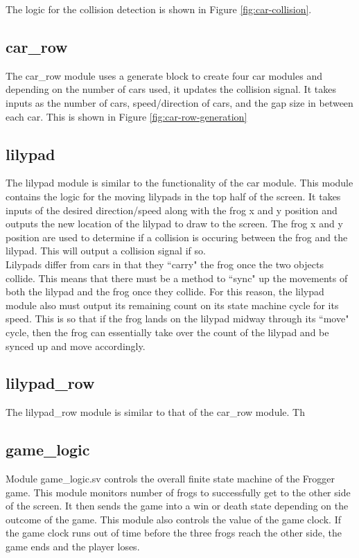 \documentclass[journal, twocolumn, final,11pt,letterpaper]{IEEEtran}
\begin{document}
	The logic for the collision detection is shown in Figure \ref{fig:car-collision}.
	

	\subsection{car\_row}
	The car\_row module uses a generate block to create four car modules and depending on the number of cars used, it updates the collision signal. It takes inputs as the number of cars, speed/direction of cars, and the gap size in between each car. This is shown in Figure \ref{fig:car-row-generation}
	
	
	\subsection{lilypad}
	The lilypad module is similar to the functionality of the car module. This module contains the logic for the moving lilypads in the top half of the screen. It takes inputs of the desired direction/speed along with the frog x and y position and outputs the new location of the lilypad to draw to the screen. The frog x and y position are used to determine if a collision is occuring between the frog and the lilypad. This will output a collision signal if so. \\
	
	Lilypads differ from cars in that they ``carry" the frog once the two objects collide. This means that there must be a method to ``sync" up the movements of both the lilypad and the frog once they collide. For this reason, the lilypad module also must output its remaining count on its state machine cycle for its speed. This is so that if the frog lands on the lilypad midway through its ``move" cycle, then the frog can essentially take over the count of the lilypad and be synced up and move accordingly.
	
	\subsection{lilypad\_row}
	The lilypad\_row module is similar to that of the car\_row module. Th
	\subsection{game\_logic}
	Module game\_logic.sv controls the overall finite state machine of the Frogger game.  This module monitors number of frogs to successfully get to the other side of the screen.  It then sends the game into a win or death state depending on the outcome of the game.  This module also controls the value of the game clock.  If the game clock runs out of time before the three frogs reach the other side, the game ends and the player loses. 
\end{document}
